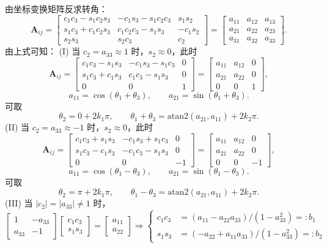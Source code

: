 由坐标变换矩阵反求转角：
\[
\boldsymbol{A}_{ij}=
\begin{bmatrix}
c_1c_3-s_1c_2s_3 & -c_1s_3-s_1c_2c_3 & s_1s_2\\
s_1c_3+c_1c_2s_3 & c_1c_2c_3-s_1s_3 & -c_1s_2\\
s_2s_3 & s_2c_3 & c_2
\end{bmatrix}
=
\begin{bmatrix}
a_{11} & a_{12} & a_{13}\\
a_{21} & a_{22} & a_{23}\\
a_{31} & a_{32} & a_{33}
\end{bmatrix}.
\]
由上式可知：
(I) 当 $c_2=a_{33}\approx 1$ 时，$s_2\approx 0$，此时
\[
\boldsymbol{A}_{ij}=
\begin{bmatrix}
c_1c_3-s_1s_3 & -c_1s_3-s_1c_3 & 0\\
s_1c_3+c_1s_3 & c_1c_3-s_1s_3 & 0\\
0 & 0 & 1
\end{bmatrix}
=
\begin{bmatrix}
a_{11} & a_{12} & 0\\
a_{21} & a_{22} & 0\\
0 & 0 & 1
\end{bmatrix},
\]
\[
a_{11}=\cos(\theta_1+\theta_3),\qquad a_{21}=\sin(\theta_1+\theta_3).
\]
可取
\[
\theta_2=0+2k_1\pi,\qquad \theta_1+\theta_3=\mathrm{atan2}(a_{21},a_{11})+2k_2\pi.
\]
(II) 当 $c_2=a_{33}\approx -1$ 时，$s_2\approx 0$，此时
\[
\boldsymbol{A}_{ij}=
\begin{bmatrix}
c_1c_3+s_1s_3 & -c_1s_3+s_1c_3 & 0\\
s_1c_3-c_1s_3 & -c_1c_3-s_1s_3 & 0\\
0 & 0 & -1
\end{bmatrix}
=
\begin{bmatrix}
a_{11} & a_{12} & 0\\
a_{21} & a_{22} & 0\\
0 & 0 & -1
\end{bmatrix},
\]
\[
a_{11}=\cos(\theta_1-\theta_3),\qquad a_{21}=\sin(\theta_1-\theta_3).
\]
可取
\[
\theta_2=\pi+2k_1\pi,\qquad \theta_1-\theta_3=\mathrm{atan2}(a_{21},a_{11})+2k_2\pi.
\]
(III) 当 $|c_2|=|a_{33}|\neq 1$ 时，
\[
\begin{bmatrix}
1 & -a_{33}\\
a_{33} & -1
\end{bmatrix}
\begin{bmatrix}
c_1c_3\\
s_1s_3
\end{bmatrix}
=
\begin{bmatrix}
a_{11}\\
a_{22}
\end{bmatrix}
\Rightarrow
\left\{\begin{aligned}
c_1c_3 &= (a_{11}-a_{22}a_{33})/(1-a_{33}^2)=:b_1\\
s_1s_3 &= (-a_{22}+a_{11}a_{33})/(1-a_{33}^2)=:b_2
\end{aligned}\right.
\]

